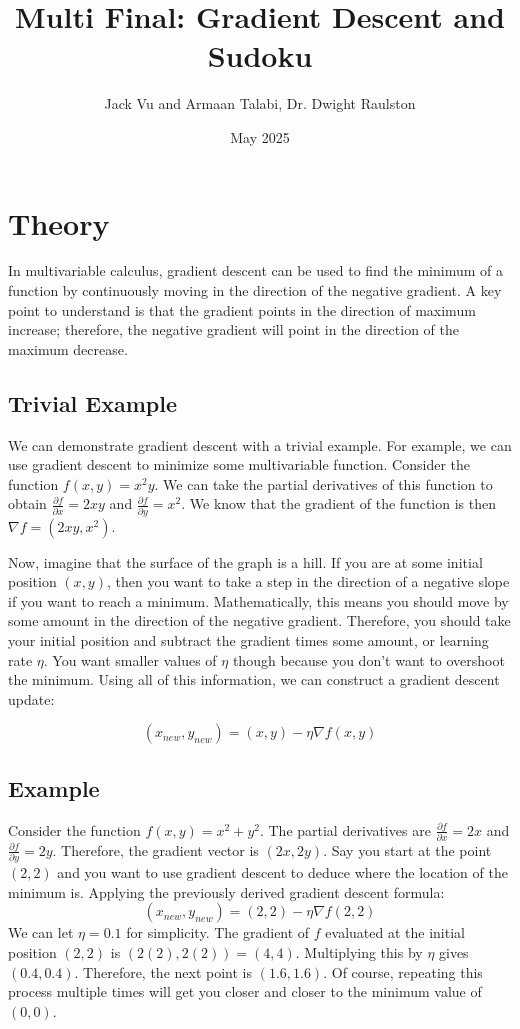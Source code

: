 \documentclass[12pt]{article}
\title{Multi Final: Gradient Descent and Sudoku}
\author{Jack Vu and Armaan Talabi, Dr. Dwight Raulston}
\date{May 2025}
\begin{document}
\maketitle
\section*{Theory}
In multivariable calculus, gradient descent can be used to find the minimum of a function by continuously moving in the direction of the negative gradient. A key point to understand is that the gradient points in the direction of maximum increase; therefore, the negative gradient will point in the direction of the maximum decrease.
\subsection*{Trivial Example}
We can demonstrate gradient descent with a trivial example. For example, we can use gradient descent to minimize some multivariable function. Consider the function $f(x, y) = x^2y$. We can take the partial derivatives of this function to obtain $\frac{\partial f}{\partial x} = 2xy$ and $\frac{\partial f}{\partial y} = x^2$. We know that the gradient of the function is then $\nabla f = (2xy, x^2)$.

Now, imagine that the surface of the graph is a hill. If you are at some initial position $(x, y)$, then you want to take a step in the direction of a negative slope if you want to reach a minimum. Mathematically, this means you should move by some amount in the direction of the negative gradient. Therefore, you should take your initial position and subtract the gradient times some amount, or learning rate $\eta$. You want smaller values of $\eta$ though because you don't want to overshoot the minimum. Using all of this information, we can construct a gradient descent update:

\[(x_{new}, y_{new}) = (x, y) - \eta \nabla f(x, y)\]

\subsection*{Example}
Consider the function $f(x, y) = x^2 + y^2$. The partial derivatives are $\frac{\partial f}{\partial x} = 2x$ and $\frac{\partial f}{\partial y} = 2y$. Therefore, the gradient vector is $(2x, 2y)$. Say you start at the point $(2, 2)$ and you want to use gradient descent to deduce where the location of the minimum is. Applying the previously derived gradient descent formula:
\[(x_{new}, y_{new}) = (2, 2) - \eta \nabla f(2, 2)\]
We can let $\eta = 0.1$ for simplicity. The gradient of $f$ evaluated at the initial position $(2, 2)$ is $(2(2), 2(2)) = (4, 4)$. Multiplying this by $\eta$ gives $(0.4, 0.4)$. Therefore, the next point is $(1.6, 1.6)$. Of course, repeating this process multiple times will get you closer and closer to the minimum value of $(0, 0)$.
\end{document}
